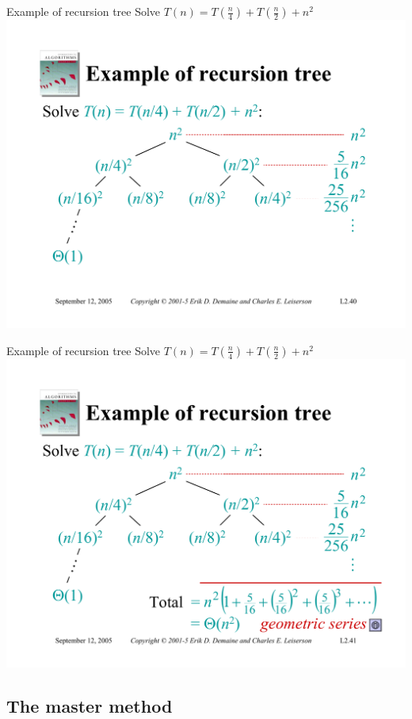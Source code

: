 \documentclass{beamer}
\begin{document}
\begin{frame}{Example of recursion tree}
    Solve $T(n) = T\left(\frac{n}{4}\right) + T\left(\frac{n}{2}\right) + n^2$
    \includegraphics[width=\textwidth, trim={1.10cm 1.20cm 0.30cm 5.75cm}, clip]{pages/lec2_40}
\end{frame}
\begin{frame}{Example of recursion tree}
    Solve $T(n) = T\left(\frac{n}{4}\right) + T\left(\frac{n}{2}\right) + n^2$
    \includegraphics[width=\textwidth, trim={1.10cm 1.20cm 0.30cm 5.75cm}, clip]{pages/lec2_41}
\end{frame}

\subsection{The master method}
\end{document}

